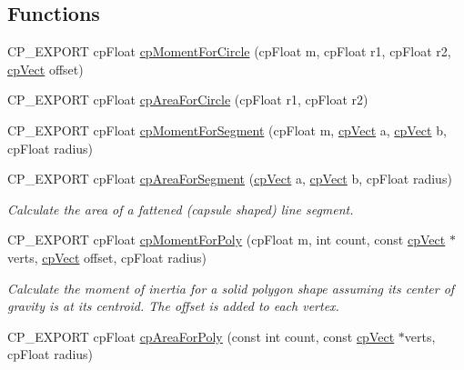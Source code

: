 \subsection*{Functions}
\begin{DoxyCompactItemize}
\item 
C\+P\+\_\+\+E\+X\+P\+O\+RT cp\+Float \hyperlink{group__misc_gafa2103fb2fd788fded1131e53f00681a}{cp\+Moment\+For\+Circle} (cp\+Float m, cp\+Float r1, cp\+Float r2, \hyperlink{structcpVect}{cp\+Vect} offset)
\item 
C\+P\+\_\+\+E\+X\+P\+O\+RT cp\+Float \hyperlink{group__misc_ga55a50f3dfa695db703759e550db16bce}{cp\+Area\+For\+Circle} (cp\+Float r1, cp\+Float r2)
\item 
C\+P\+\_\+\+E\+X\+P\+O\+RT cp\+Float \hyperlink{group__misc_ga9548fe7830d426bde625d39d4687e6be}{cp\+Moment\+For\+Segment} (cp\+Float m, \hyperlink{structcpVect}{cp\+Vect} a, \hyperlink{structcpVect}{cp\+Vect} b, cp\+Float radius)
\item 
\mbox{\label{group__misc_ga5758bdfd93aec5d3f3780a1ff29aad37}} 
C\+P\+\_\+\+E\+X\+P\+O\+RT cp\+Float \hyperlink{group__misc_ga5758bdfd93aec5d3f3780a1ff29aad37}{cp\+Area\+For\+Segment} (\hyperlink{structcpVect}{cp\+Vect} a, \hyperlink{structcpVect}{cp\+Vect} b, cp\+Float radius)
\begin{DoxyCompactList}\small\item\em Calculate the area of a fattened (capsule shaped) line segment. \end{DoxyCompactList}\item 
\mbox{\label{group__misc_gaa69a0e62a94f55c347eb66160963ff6e}} 
C\+P\+\_\+\+E\+X\+P\+O\+RT cp\+Float \hyperlink{group__misc_gaa69a0e62a94f55c347eb66160963ff6e}{cp\+Moment\+For\+Poly} (cp\+Float m, int count, const \hyperlink{structcpVect}{cp\+Vect} $\ast$verts, \hyperlink{structcpVect}{cp\+Vect} offset, cp\+Float radius)
\begin{DoxyCompactList}\small\item\em Calculate the moment of inertia for a solid polygon shape assuming it\textquotesingle{}s center of gravity is at it\textquotesingle{}s centroid. The offset is added to each vertex. \end{DoxyCompactList}\item 
C\+P\+\_\+\+E\+X\+P\+O\+RT cp\+Float \hyperlink{group__misc_ga2bc17e58f105411e2d66c09f8047d822}{cp\+Area\+For\+Poly} (const int count, const \hyperlink{structcpVect}{cp\+Vect} $\ast$verts, cp\+Float radius)

\end{DoxyCompactItemize}
